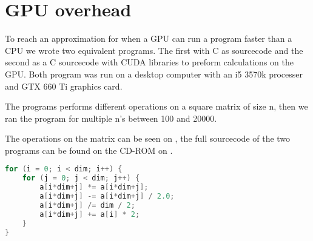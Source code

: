 \chapter{GPU overhead}
\label{app:gpuoverhead}
To reach an approximation for when a GPU can run a program faster than a CPU  we wrote two equivalent programs.
The first with C as sourcecode and the second as a C sourcecode with CUDA libraries to preform calculations on the GPU.
Both program was run on a desktop computer with an i5 3570k processer and GTX 660 Ti graphics card.

The programs performs different operations on a square matrix of size n, then we ran the program for multiple n's between 100 and 20000.

The operations on the matrix can be seen on , the full sourcecode of the two programs can be found on the CD-ROM on .

\begin{lstlisting}[language=C,caption={Operations on the matrix},label=gpuoversource,frame=single]
for (i = 0; i < dim; i++) {
	for (j = 0; j < dim; j++) {
		a[i*dim+j] *= a[i*dim+j];
		a[i*dim+j] -= a[i*dim+j] / 2.0;
		a[i*dim+j] /= dim / 2;
		a[i*dim+j] += a[i] * 2;
	}
}
\end{lstlisting}

